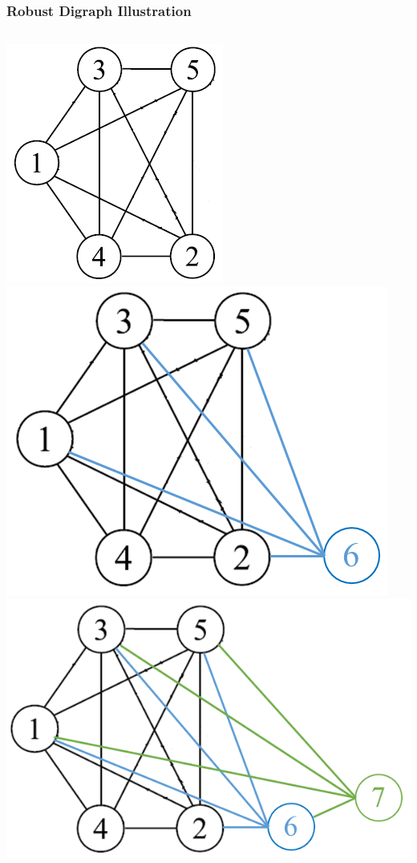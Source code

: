 \documentclass{beamer}
\begin{document}
\begin{frame}
\frametitle{Robust Digraph Illustration}
\begin{columns}[t]
    \includegraphics[scale=0.32]{figures/RobustDigraph0.png}
	\centering \\	
    \includegraphics[scale=0.25]{figures/RobustDigraph1.png}
	\centering \\
    \includegraphics[scale=0.25]{figures/RobustDigraph2.png}

\end{columns}
\end{frame}
\end{document}
